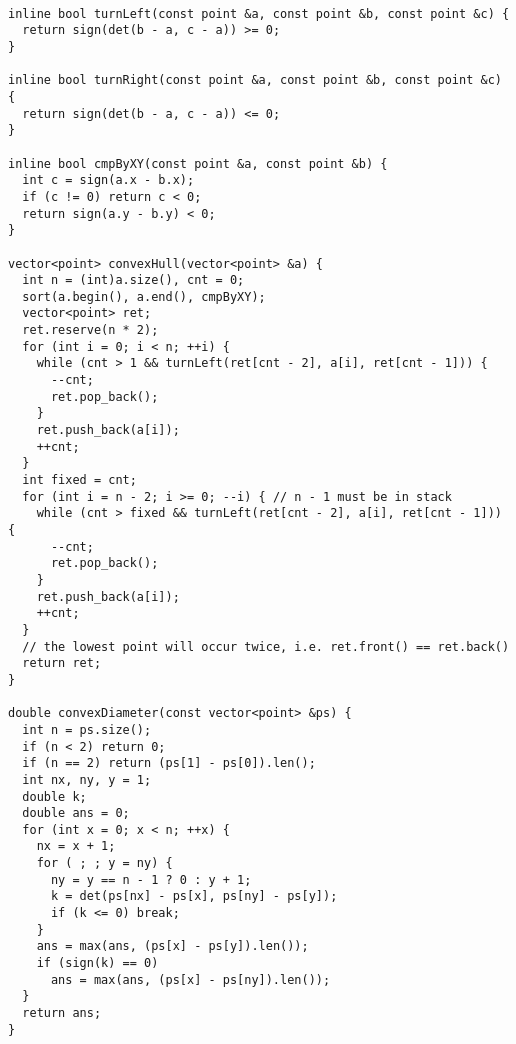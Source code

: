 \begin{lstlisting}

inline bool turnLeft(const point &a, const point &b, const point &c) {
  return sign(det(b - a, c - a)) >= 0;
}

inline bool turnRight(const point &a, const point &b, const point &c) {
  return sign(det(b - a, c - a)) <= 0;
}

inline bool cmpByXY(const point &a, const point &b) {
  int c = sign(a.x - b.x);
  if (c != 0) return c < 0;
  return sign(a.y - b.y) < 0;
}

vector<point> convexHull(vector<point> &a) {
  int n = (int)a.size(), cnt = 0;
  sort(a.begin(), a.end(), cmpByXY);
  vector<point> ret;
  ret.reserve(n * 2);
  for (int i = 0; i < n; ++i) {
    while (cnt > 1 && turnLeft(ret[cnt - 2], a[i], ret[cnt - 1])) {
      --cnt;
      ret.pop_back();
    }
    ret.push_back(a[i]);
    ++cnt;
  }
  int fixed = cnt;
  for (int i = n - 2; i >= 0; --i) { // n - 1 must be in stack
    while (cnt > fixed && turnLeft(ret[cnt - 2], a[i], ret[cnt - 1])) {
      --cnt;
      ret.pop_back();
    }
    ret.push_back(a[i]);
    ++cnt;
  }
  // the lowest point will occur twice, i.e. ret.front() == ret.back()
  return ret;
}

double convexDiameter(const vector<point> &ps) {
  int n = ps.size();
  if (n < 2) return 0;
  if (n == 2) return (ps[1] - ps[0]).len();
  int nx, ny, y = 1;
  double k;
  double ans = 0;
  for (int x = 0; x < n; ++x) {
    nx = x + 1;
    for ( ; ; y = ny) {
      ny = y == n - 1 ? 0 : y + 1;
      k = det(ps[nx] - ps[x], ps[ny] - ps[y]);
      if (k <= 0) break;
    }
    ans = max(ans, (ps[x] - ps[y]).len());
    if (sign(k) == 0)
      ans = max(ans, (ps[x] - ps[ny]).len());
  }
  return ans;
}

\end{lstlisting}